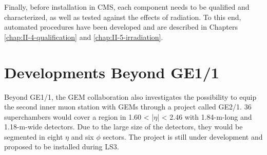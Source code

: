     Finally, before installation in CMS, each component needs to be qualified and characterized, as well as tested against the effects of radiation. To this end, automated procedures have been developed and are described in Chapters \ref{chap:II-4-qualification} and \ref{chap:II-5-irradiation}.

  \section{Developments Beyond GE1/1}

    Beyond GE1/1, the GEM collaboration also investigates the possibility to equip the second inner muon station with GEMs through a project called GE2/1. 36 superchambers would cover a region in 1.60 < |$\eta$| < 2.46 with 1.84-m-long and 1.18-m-wide detectors. Due to the large size of the detectors, they would be segmented in eight $ \eta $ and six $ \phi $ sectors. The project is still under development and proposed to be installed during LS3.
